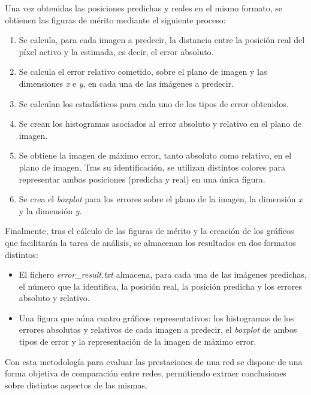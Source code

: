 Una vez obtenidas las posiciones predichas y reales en el mismo formato, se obtienen las figuras de mérito mediante el siguiente proceso:

\begin{enumerate}
    \item Se calcula, para cada imagen a predecir, la distancia entre la posición real del píxel activo y la estimada, es decir, el error absoluto.
    \item Se calcula el error relativo cometido, sobre el plano de imagen y las dimensiones \textit{x} e \textit{y}, en cada una de las imágenes a predecir.
    \item Se calculan los estadísticos para cada uno de los tipos de error obtenidos.
    \item Se crean los histogramas asociados al error absoluto y relativo en el plano de imagen.
    \item Se obtiene la imagen de máximo error, tanto absoluto como relativo, en el plano de imagen. Tras su identificación, se utilizan distintos colores para representar ambas posiciones (predicha y real) en una única figura.
    \item Se crea el \textit{boxplot} para los errores sobre el plano de la imagen, la dimensión \textit{x} y la dimensión \textit{y}. 
\end{enumerate}

Finalmente, tras el cálculo de las figuras de mérito y la creación de los gráficos que facilitarán la tarea de análisis, se almacenan los resultados en dos formatos distintos:
\begin{itemize}
    \item El fichero \textit{error}\_\textit{result.txt} almacena, para cada una de las imágenes predichas, el número que la identifica, la posición real, la posición predicha y los errores absoluto y relativo.
    \item Una figura que aúna cuatro gráficos representativos: los histogramas de los errores absolutos y relativos de cada imagen a predecir, el \textit{boxplot} de ambos tipos de error y la representación de la imagen de máximo error.
    
\end{itemize}

Con esta metodología para evaluar las prestaciones de una red se dispone de una forma objetiva de comparación entre redes, permitiendo  extraer conclusiones sobre distintos aspectos de las mismas.